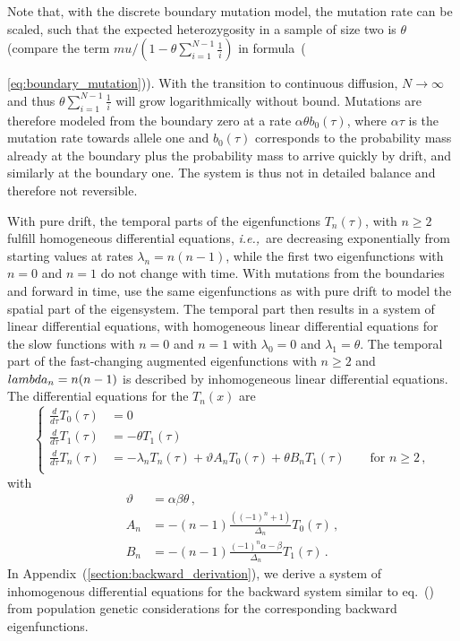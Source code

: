 \documentclass[preprint]{elsarticle}
\newcommand\ie{{\it i.e.,}}
\begin{document}
Note that, with the discrete boundary mutation model, the mutation rate can be scaled, such that the expected heterozygosity in a sample of size two is $\theta$ (compare the term $mu/(1-\theta\sum_{i=1}^{N-1}\frac{1}{i})$ in formula~({\ref{eq:boundary_mutation})). With the transition to continuous diffusion, $N\to\infty$ and thus $\theta\sum_{i=1}^{N-1}\frac{1}{i}$ will grow logarithmically without bound. Mutations are therefore modeled from the boundary zero at a rate $\alpha\theta b_0(\tau)$, where $\alpha\tau$ is the mutation rate towards allele one and $b_0(\tau)$ corresponds to the probability mass already at the boundary plus the probability mass to arrive quickly by drift, and similarly at the boundary one. The system is thus not in detailed balance and therefore not reversible.

With pure drift, the temporal parts of the eigenfunctions $T_n(\tau)$, with $n\geq 2$ fulfill homogeneous differential equations, \ie\ are decreasing exponentially from starting values at rates $\lambda_n=n(n-1)$, while the first two eigenfunctions with $n=0$ and $n=1$ do not change with time. With mutations from the boundaries and forward in time, \citet{Vogl16} use the same eigenfunctions as with pure drift to model the spatial part of the eigensystem. The temporal part then results in a system of linear differential equations, with homogeneous linear differential equations for the slow functions with $n=0$ and $n=1$ with $\lambda_0=0$ and $\lambda_1=\theta$. The temporal part of the fast-changing augmented eigenfunctions with $n\geq 2$ and $\\lambda_n=n(n-1)$ is described by inhomogeneous linear differential equations. The differential equations for the $T_n(x)$ are
\begin{equation}\label{eq:forward_inhomogenous}
\begin{cases}
  \frac{d}{d\tau} T_0(\tau)&= 0\\
  \frac{d}{d\tau} T_1(\tau)&= -\theta T_1(\tau)\\
  \frac{d}{d\tau} T_n(\tau)&= -\lambda_n T_n(\tau)+\vartheta A_n T_0(\tau)+\theta B_n T_1(\tau) \qquad\text{for $n\geq 2$}\,,\\
\end{cases}
\end{equation}
with
\begin{equation}
\begin{split}
    \vartheta&=\alpha\beta\theta\,,\\
    A_n&=-(n-1)\frac{((-1)^n+1)}{\Delta_n}T_0(\tau)\,,\\
    B_n&=-(n-1)\frac{(-1)^n\alpha-\beta}{\Delta_n}T_1(\tau)\,.
\end{split}
\end{equation}
In Appendix~(\ref{section:backward_derivation}), we derive a system of inhomogenous differential equations for the backward system similar to eq.~(\label{eq:forward_inhomogenous}) from population genetic considerations for the corresponding backward eigenfunctions. 

}
\end{document}
